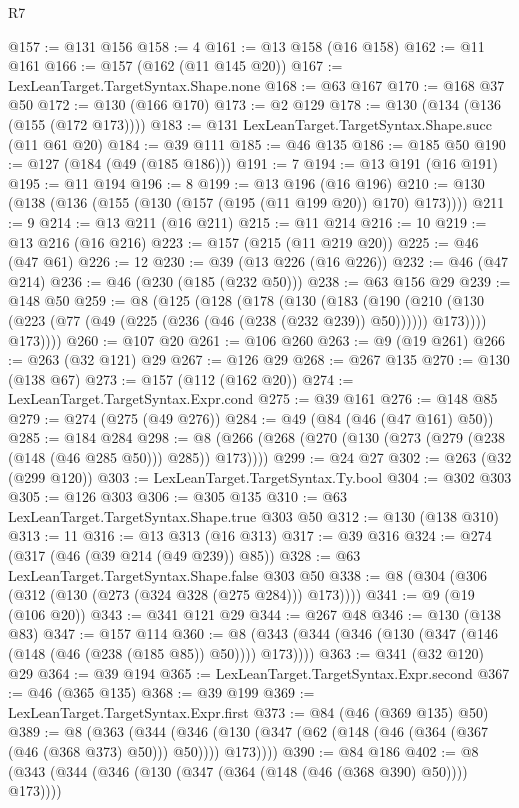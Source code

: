 \begin{lexlean}{R7}
\begin{coremodule}
@157 := @131 @156
@158 := 4
@161 := @13 @158 (@16 @158)
@162 := @11 @161
@166 := @157 (@162 (@11 @145 @20))
@167 := LexLeanTarget.TargetSyntax.Shape.none
@168 := @63 @167
@170 := @168 @37 @50
@172 := @130 (@166 @170)
@173 := @2 @129
@178 := @130 (@134 (@136 (@155 (@172 @173))))
@183 := @131 LexLeanTarget.TargetSyntax.Shape.succ (@11 @61 @20)
@184 := @39 @111
@185 := @46 @135
@186 := @185 @50
@190 := @127 (@184 (@49 (@185 @186)))
@191 := 7
@194 := @13 @191 (@16 @191)
@195 := @11 @194
@196 := 8
@199 := @13 @196 (@16 @196)
@210 := @130 (@138 (@136 (@155 (@130 (@157 (@195 (@11 @199 @20)) @170) @173))))
@211 := 9
@214 := @13 @211 (@16 @211)
@215 := @11 @214
@216 := 10
@219 := @13 @216 (@16 @216)
@223 := @157 (@215 (@11 @219 @20))
@225 := @46 (@47 @61)
@226 := 12
@230 := @39 (@13 @226 (@16 @226))
@232 := @46 (@47 @214)
@236 := @46 (@230 (@185 (@232 @50)))
@238 := @63 @156 @29
@239 := @148 @50
@259 := @8
    (@125
      (@128
        (@178
          (@130
            (@183
              (@190
                (@210 (@130 (@223 (@77 (@49 (@225 (@236 (@46 (@238 (@232 @239)) @50)))))) @173))))
            @173))))
@260 := @107 @20
@261 := @106 @260
@263 := @9 (@19 @261)
@266 := @263 (@32 @121) @29
@267 := @126 @29
@268 := @267 @135
@270 := @130 (@138 @67)
@273 := @157 (@112 (@162 @20))
@274 := LexLeanTarget.TargetSyntax.Expr.cond
@275 := @39 @161
@276 := @148 @85
@279 := @274 (@275 (@49 @276))
@284 := @49 (@84 (@46 (@47 @161) @50))
@285 := @184 @284
@298 := @8 (@266 (@268 (@270 (@130 (@273 (@279 (@238 (@148 (@46 @285 @50))) @285)) @173))))
@299 := @24 @27
@302 := @263 (@32 (@299 @120))
@303 := LexLeanTarget.TargetSyntax.Ty.bool
@304 := @302 @303
@305 := @126 @303
@306 := @305 @135
@310 := @63 LexLeanTarget.TargetSyntax.Shape.true @303 @50
@312 := @130 (@138 @310)
@313 := 11
@316 := @13 @313 (@16 @313)
@317 := @39 @316
@324 := @274 (@317 (@46 (@39 @214 (@49 @239)) @85))
@328 := @63 LexLeanTarget.TargetSyntax.Shape.false @303 @50
@338 := @8 (@304 (@306 (@312 (@130 (@273 (@324 @328 (@275 @284))) @173))))
@341 := @9 (@19 (@106 @20))
@343 := @341 @121 @29
@344 := @267 @48
@346 := @130 (@138 @83)
@347 := @157 @114
@360 := @8 (@343 (@344 (@346 (@130 (@347 (@146 (@148 (@46 (@238 (@185 @85)) @50)))) @173))))
@363 := @341 (@32 @120) @29
@364 := @39 @194
@365 := LexLeanTarget.TargetSyntax.Expr.second
@367 := @46 (@365 @135)
@368 := @39 @199
@369 := LexLeanTarget.TargetSyntax.Expr.first
@373 := @84 (@46 (@369 @135) @50)
@389 := @8
    (@363
      (@344 (@346 (@130 (@347 (@62 (@148 (@46 (@364 (@367 (@46 (@368 @373) @50))) @50)))) @173))))
@390 := @84 @186
@402 := @8 (@343 (@344 (@346 (@130 (@347 (@364 (@148 (@46 (@368 @390) @50)))) @173))))

\end{coremodule}
\end{lexlean}

